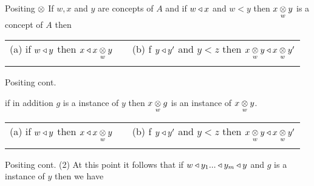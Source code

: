 \begin{frame}{Positing $\cross$}
If $w,x$ and $y$ are concepts of $A$  and if $w \base x$ and $w < y$ then $\crossx{x}{y}{w}$ is a concept of $A$ then
\pause
\begin{tabular} {c p{0.2cm} c}
(a) if $w \base y$ then $x \base \crossx{x}{y}{w}$   &&   (b) f $y \base y'$ and $y <z$ then $ \crossx{x}{y}{w}  \base \crossx{x}{y'}{w}$ \\[0.5cm]
&& \\
\end{tabular}
\end{frame}

\begin{frame} {Positing cont.}

if in addition $g$ is a instance of $y$ then $\crossx{x}{g}{w}$ is an instance of $\crossx{x}{y}{w}$.
\pause
\begin{tabular} {c p{0.2cm} c}
(a) if $w \base y$ then $x \base \crossx{x}{y}{w}$   &&   (b) f $y \base y'$ and $y <z$ then $ \crossx{x}{y}{w}  \base \crossx{x}{y'}{w}$ \\[0.5cm]
&& \\
\end{tabular}
\end{frame}

\begin{frame} {Positing cont. (2)}
At this point it follows that if $w \base y_1 ... \base y_m \base y$ and $g$ is a instance of $y$ then we have


\vspace{0.5cm}
\end{frame}



